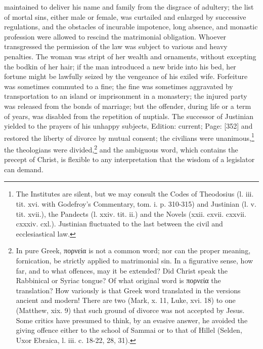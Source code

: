 maintained to deliver his name and family from the disgrace of adultery; the list of mortal sins, either male or female, was curtailed and enlarged by successive regulations, and the obstacles of incurable impotence, long absence, and monastic profession were allowed to rescind the matrimonial obligation. Whoever transgressed the permission of the law was subject to various and heavy penalties. The woman was stript of her wealth and ornaments, without excepting the bodkin of her hair; if the man introduced a new bride into his bed, her fortune might be lawfully seized by the vengeance of his exiled wife. Forfeiture was sometimes commuted to a fine; the fine was sometimes aggravated by transportation to an island or imprisonment in a monastery; the injured party was released from the bonds of marriage; but the offender, during life or a term of years, was disabled from the repetition of nuptials. The successor of Justinian yielded to the prayers of his unhappy subjects, Edition: current; Page: [352] and restored the liberty of divorce by mutual consent; the civilians were unanimous,\footnote{The Institutes are silent, but we may consult the Codes of Theodosius (l. iii. tit. xvi. with Godefroy\texthebrew{}’s Commentary, tom. i. p. 310-315) and Justinian (l. v. tit. xvii.), the Pandects (l. xxiv. tit. ii.) and the Novels (xxii. cxvii. cxxvii. cxxxiv. cxl.). Justinian fluctuated to the last between the civil and ecclesiastical law.} the theologians were divided,\footnote{In pure Greek, \textgreek{πορνεία} is not a common word; nor can the proper meaning, fornication, be strictly applied to matrimonial sin. In a figurative sense, how far, and to what offences, may it be extended? Did Christ speak the Rabbinical or Syriac tongue? Of what original word is \textgreek{πορνεία} the translation? How variously is that Greek word translated in the versions ancient and modern! There are two (Mark, x. 11, Luke, xvi. 18) to one (Matthew, xix. 9) that such ground of divorce was not accepted by Jesus. Some critics have presumed to think, by an evasive answer, he avoided the giving offence either to the school of Sammai or to that of Hillel (Selden, Uxor Ebraica, l. iii. c. 18-22, 28, 31).} and the ambiguous word, which contains the precept of Christ, is flexible to any interpretation that the wisdom of a legislator can demand.

